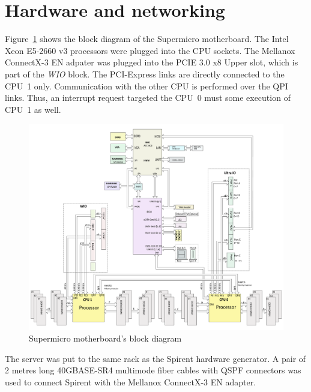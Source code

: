 
\section{Hardware and networking}\label{sec:setup-hardware}
Figure~\ref{fig:setup-supermicro-board} shows the block diagram of the Supermicro motherboard.
The Intel Xeon E5-2660 v3 processors were plugged into the CPU sockets.
The Mellanox ConnectX-3 EN adpater was plugged into the PCIE 3.0 x8 Upper slot,
which is part of the {\it{WIO}} block.
The PCI-Express links are directly connected to the CPU~1 only.
Communication with the other CPU is performed over the QPI links.
Thus, an interrupt request targeted the CPU~0 must some execution of CPU~1 as well.
\begin{figure}
	\centering
	\includegraphics[width=15cm,keepaspectratio]{fig/supermicro-x10drui.png}
	\caption{Supermicro motherboard's block diagram}
	\label{fig:setup-supermicro-board}
\end{figure}

The server was put to the same rack as the Spirent hardware generator.
A pair of 2 metres long 40GBASE-SR4 multimode fiber cables with QSPF connectors
was used to connect Spirent with the Mellanox ConnectX-3 EN adapter.

